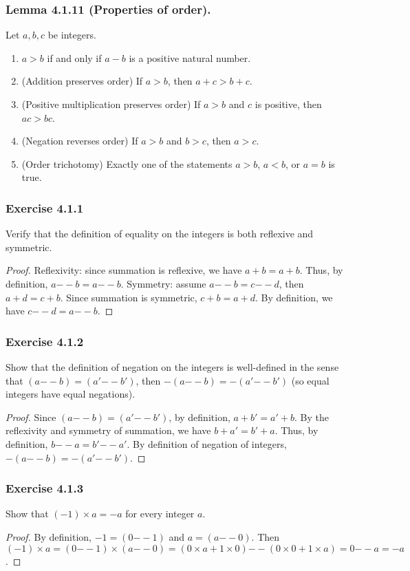 \documentclass[12pt, letter]{article}
\begin{document}
\subsubsection*{Lemma 4.1.11 (Properties of order).}
Let $a,b,c$ be integers.
\begin{enumerate}[label=(\alph*)]
    \item $a>b$ if and only if $a-b$ is a positive natural number.
    \item (Addition preserves order) If $a>b$, then $a+c>b+c$.
    \item (Positive multiplication preserves order) If $a>b$ and $c$ is positive, then $ac>bc$.
    \item (Negation reverses order) If $a>b$ and $b>c$, then $a>c$.
    \item (Order trichotomy) Exactly one of the statements $a>b$, $a<b$, or $a=b$ is true.
\end{enumerate}
\subsubsection*{Exercise 4.1.1}
Verify that the definition of equality on the integers is both reflexive and symmetric.
\begin{proof}
    Reflexivity: since summation is reflexive, we have $a+b=a+b$. Thus, by definition, $a\mathtt{--}b=a\mathtt{--}b$. Symmetry: assume $a\mathtt{--}b=c\mathtt{--}d$, then $a+d=c+b$.
    Since summation is symmetric, $c+b=a+d$. By definition, we have $c\mathtt{--}d=a\mathtt{--}b$.
\end{proof}
\subsubsection*{Exercise 4.1.2}
Show that the definition of negation on the integers is well-defined in the sense that $(a\mathtt{--}b)=(a'\mathtt{--}b')$, then $-(a\mathtt{--}b)=-(a'\mathtt{--}b')$ (so equal integers have equal negations).
\begin{proof}
    Since $(a\mathtt{--}b)=(a'\mathtt{--}b')$, by definition, $a+b'=a'+b$. By the reflexivity and symmetry of summation, we have $b+a'=b'+a$. Thus, by definition, 
    $b\mathtt{--}a=b'\mathtt{--}a'$. By definition of negation of integers, $-(a\mathtt{--}b)=-(a'\mathtt{--}b')$.
\end{proof}
\subsubsection*{Exercise 4.1.3}
Show that $(-1)\times a=-a$ for every integer $a$.
\begin{proof}
    By definition, $-1=(0\mathtt{--}1)$ and $a=(a\mathtt{--}0)$. Then $(-1)\times a=(0\mathtt{--}1)\times (a\mathtt{--}0)=(0\times a+1\times 0)\mathtt{--}(0\times 0+1\times a)=0\mathtt{--}a=-a$.
\end{proof}
\end{document}
